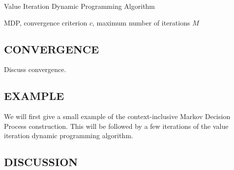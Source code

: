 \documentclass[]{article}
\begin{document}
\begin{algorithm}
\caption{Value Iteration Dynamic Programming Algorithm}
\label{alg:value-iteration-dynamic}
\begin{algorithmic}[1]
\REQUIRE MDP, convergence criterion $c$, maximum number of iterations $M$
        \ENDIF
    \ENDFOR
        \ENDIF
    \ENDIF
\ENDFOR
\end{algorithmic}
\end{algorithm}


\subsection{CONVERGENCE} Discuss convergence.

\subsection{EXAMPLE}

We will first give a small example of the context-inclusive Markov Decision Process construction. This will be followed by a few iterations of the value iteration dynamic programming algorithm.





\subsection{DISCUSSION}
\end{document}
